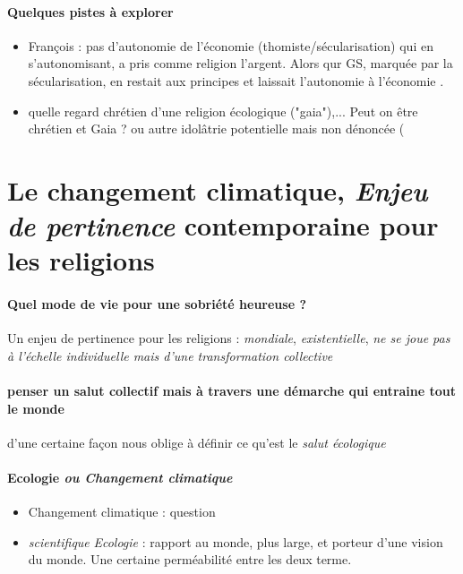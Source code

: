\paragraph{Quelques pistes à explorer}
\begin{itemize}
    \item François : pas d'autonomie de l'économie (thomiste/sécularisation) qui en s'autonomisant, a pris comme religion l'argent. Alors qur GS, marquée par la sécularisation, en restait aux principes et laissait l'autonomie à l'économie \cite{cavanaugh_idolatrie_2022}. 
    \item  quelle regard chrétien d'une religion écologique ("gaia"),... Peut on être chrétien et Gaia ? ou autre idolâtrie potentielle mais non dénoncée (
\end{itemize}



\section{Le changement climatique, \textit{Enjeu de pertinence} contemporaine pour les religions} 


\paragraph{Quel mode de vie  pour une sobriété heureuse ?}  


 Un enjeu de pertinence pour les religions : \textit{mondiale}, \textit{existentielle}, \textit{ne se joue pas à l'échelle individuelle mais d'une transformation collective}

\paragraph{penser un salut collectif mais à travers une démarche qui entraine tout le monde } d'une certaine façon nous oblige à définir ce qu'est le \textit{salut écologique} 

\paragraph{Ecologie \textit{ou Changement climatique}} \begin{itemize}
    \item Changement climatique : question \item \textit{scientifique} \textit{Ecologie} : rapport au monde, plus large, et porteur d'une vision du monde. Une certaine perméabilité entre les deux terme.

\end{itemize}


